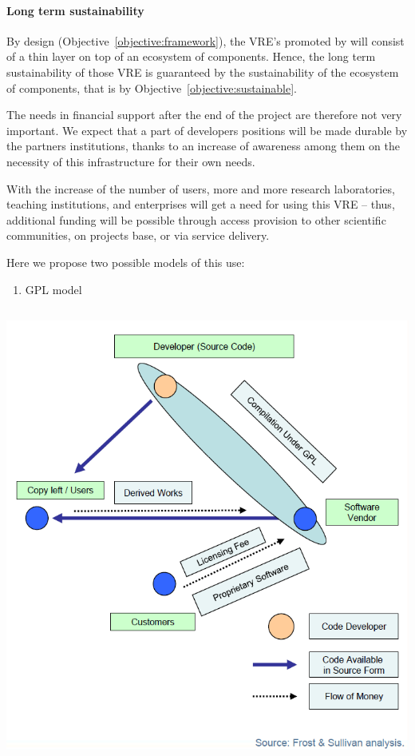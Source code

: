 \paragraph{Long term sustainability}

By design (Objective~\ref{objective:framework}), the VRE's promoted by
\TheProject will consist of a thin layer on top of an ecosystem of
components. Hence, the long term sustainability of those VRE is
guaranteed by the sustainability of the ecosystem of components, that
is by Objective~\ref{objective:sustainable}.

The needs in financial support after the end of the project are
therefore not very
important. We expect that a part of developers positions will be made
durable by the partners institutions, thanks to an increase of
awareness among them on the necessity of this infrastructure for their
own needs.

With the increase of the number of users, more and more research
laboratories, teaching institutions, and enterprises will get a need
for using this VRE – thus, additional funding will be possible through
access provision to other scientific communities, on projects base, or
via service delivery.

Here we propose two possible models of this use:

\begin{enumerate}
\item GPL model
\end{enumerate}
 \includegraphics[width=16.746cm,height=14.998cm]{Impact-img1.png}

